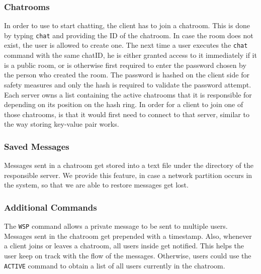 \subsubsection{Chatrooms}
\label{sec:groupchat_funtionalities_chatcommand}
In order to use to start chatting, the client has to join a chatroom. This is done by typing \texttt{chat} and providing the ID of the chatroom. In case the room does not exist, the user is allowed to create one. The next time a user executes the \texttt{chat} command with the same chatID, he is either granted access to it immediately if it is a public room, or is otherwise first required to enter the password chosen by the person who created the room. The password is hashed on the client side for safety measures and only the hash is required to validate the password attempt.
Each server owns a list containing the active chatrooms that it is responsible for depending on its position on the hash ring. In order for a client to join one of those chatrooms, is that it would first need to connect to that server, similar to the way storing key-value pair works.

\subsubsection{Saved Messages}
\label{sec:groupchat_funtionalities_savedmessages}
Messages sent in a chatroom get stored into a text file under the directory of the responsible server. We provide this feature, in case a network partition occurs in the system, so that we are able to restore messages get lost.

\subsubsection{Additional Commands}
\label{sec:groupchat_funtionalities_commands}
The \texttt{WSP} command allows a private message to be sent to multiple users.
Messages sent in the chatroom get prepended with a timestamp. Also, whenever a client joins or leaves a chatroom, all users inside get notified. This helps the user keep on track with the flow of the messages. Otherwise, users could use the \texttt{ACTIVE} command to obtain a list of all users currently in the chatroom. 

